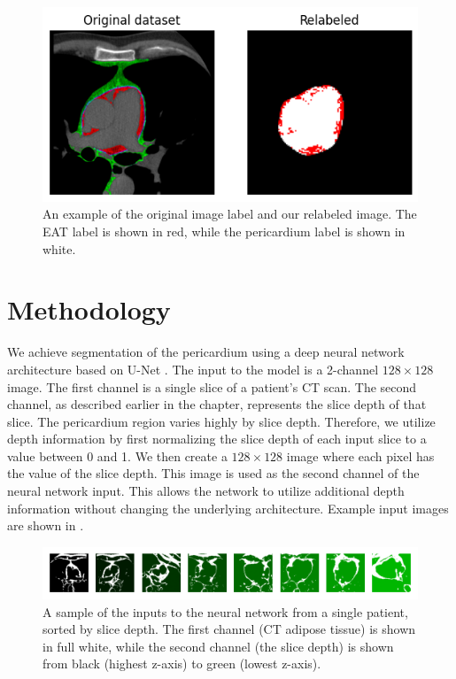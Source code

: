 \begin{figure}[h]
    \centering
    \includegraphics[width=0.65\columnwidth]{images/6/relabel}
    \caption{An example of the original image label and our relabeled image. The EAT label is shown in red, while the pericardium label is shown in white. \cite{bencevicEpicardialAdiposeTissue2021}}
    \label{fig:dataset-relabel}
\end{figure}

\section{Methodology}\label{method}

We achieve segmentation of the pericardium using a deep neural network architecture based on U-Net \cite{ronneberger2015unet}. The input to the model is a 2-channel $128 \times 128$ image. The first channel is a single slice of a patient's CT scan. The second channel, as described earlier in the chapter, represents the slice depth of that slice. The pericardium region varies highly by slice depth. Therefore, we utilize depth information by first normalizing the slice depth of each input slice to a value between 0 and 1. We then create a $128 \times 128$ image where each pixel has the value of the slice depth. This image is used as the second channel of the neural network input. This allows the network to utilize additional depth information without changing the underlying architecture. Example input images are shown in .

\begin{figure}[b]
\center
\includegraphics[width=\columnwidth]{images/6/inputs.png}
\caption{A sample of the inputs to the neural network from a single patient, sorted by slice depth. The first channel (CT adipose tissue) is shown in full white, while the second channel (the slice depth) is shown from black (highest z-axis) to green (lowest z-axis). \cite{bencevicEpicardialAdiposeTissue2021}}
\label{fig:input-images}
\end{figure}

